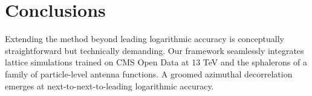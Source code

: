 \section{Conclusions}\label{sec:conclusions}

Extending the method beyond leading logarithmic accuracy is conceptually
straightforward but technically demanding. Our framework seamlessly
integrates lattice simulations trained on CMS Open Data at 13 TeV and
the sphalerons of a family of particle-level antenna functions. A
groomed azimuthal decorrelation emerges at next-to-next-to-leading
logarithmic accuracy.

